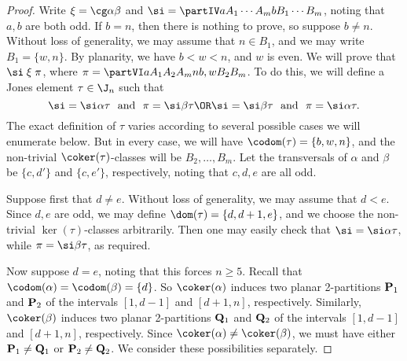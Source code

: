 \begin{proof} Write ${\mathrel\xi}=\cg\alpha\beta$ and $\si=\partIV
a{A_1}\cdots{A_m}b{B_1}\cdots{B_m}$, noting that $a,b$ are both odd.  If $b=n$, then there is nothing to prove,
so suppose $b\not=n$.  Without loss of generality, we may assume that $n\in B_1$, and we may write $B_1=\{w,n\}$.  By planarity, we have $b<w<n$, and $w$ is even.
%
We will prove that $\si\mathrel\xi\pi$, where $\pi=\partVI a{A_1}{A_2}{A_m}n{b,w}{B_2}{B_m}$.
To do this, we will define a Jones element $\tau\in\J_n$ such that
\begin{equation}\label{eq:bzn}
\si = \si\alpha\tau \ \ \text{and} \ \ \pi = \si\beta\tau
\OR
\si = \si\beta\tau \ \ \text{and} \ \  \pi = \si\alpha\tau.
\end{equation}
The exact definition of $\tau$ varies according to several possible cases we will enumerate below.  But in every case, we will have $\codom(\tau)=\{b,w,n\}$, and the non-trivial $\coker(\tau)$-classes will be $B_2,\ldots,B_m$.
%
Let the transversals of $\alpha$ and $\beta$ be $\{c,d'\}$ and $\{c,e'\}$, respectively, noting that $c,d,e$ are all odd.

\bigskip{}  Suppose first that $d\not=e$.  Without loss of generality, we may assume that $d<e$.  Since $d,e$ are odd, we may define $\dom(\tau)=\{d,d+1,e\}$, and we choose the non-trivial $\ker(\tau)$-classes arbitrarily.
%
Then one may easily check that $\si=\si\alpha\tau$, while $\pi=\si\beta\tau$, as required.

\bigskip{}  Now suppose $d=e$, noting that this forces $n\geq5$.
%
Recall that $\codom(\alpha)=\codom(\beta)=\{d\}$.  So $\coker(\alpha)$ induces two planar 2-partitions ${\bf P}_1$ and ${\bf P}_2$ of the intervals $[1,d-1]$ and $[d+1,n]$, respectively.  Similarly, $\coker(\beta)$ induces two planar 2-partitions ${\bf Q}_1$ and ${\bf Q}_2$ of the intervals $[1,d-1]$ and $[d+1,n]$, respectively.  Since $\coker(\alpha)\not=\coker(\beta)$, we must have either ${\bf P}_1\not={\bf Q}_1$ or ${\bf P}_2\not={\bf Q}_2$.  We consider these possibilities separately.


\end{proof}
